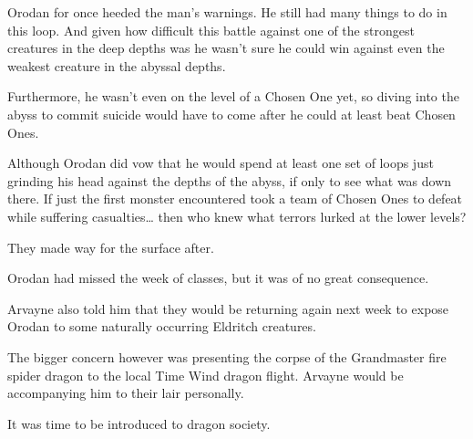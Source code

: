 \documentclass[a4paper,10pt]{book}
\begin{document}
Orodan for once heeded the man’s warnings. He still had many things to do in this loop. And given how difficult this battle against one of the strongest creatures in the deep depths was he wasn’t sure he could win against even the weakest creature in the abyssal depths.\par
Furthermore, he wasn’t even on the level of a Chosen One yet, so diving into the abyss to commit suicide would have to come after he could at least beat Chosen Ones.\par
Although Orodan did vow that he would spend at least one set of loops just grinding his head against the depths of the abyss, if only to see what was down there. If just the first monster encountered took a team of Chosen Ones to defeat while suffering casualties… then who knew what terrors lurked at the lower levels?\par
They made way for the surface after.\par
Orodan had missed the week of classes, but it was of no great consequence.\par
Arvayne also told him that they would be returning again next week to expose Orodan to some naturally occurring Eldritch creatures.\par
The bigger concern however was presenting the corpse of the Grandmaster fire spider dragon to the local Time Wind dragon flight. Arvayne would be accompanying him to their lair personally.\par
It was time to be introduced to dragon society.\par
\end{document}
